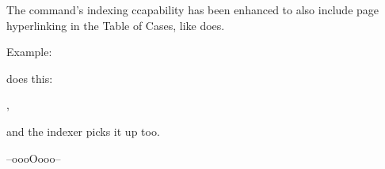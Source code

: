 \newpage
{}

\newpage
The  command's indexing ccapability has been enhanced to also include page hyperlinking in the Table of Cases, like  does.

Example:

\bigskip

\setpartysepitalicoff
{} does this: 

, 

and the indexer picks it up too.

\bigskip
\bigskip
\hfill --oooOooo--\hfill\ 








